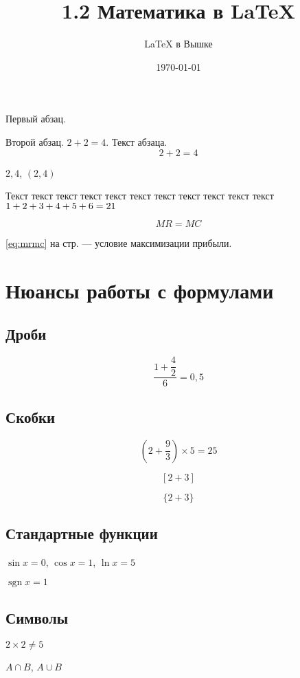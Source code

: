 \documentclass[a4paper,12pt]{article} %
\author{\LaTeX{} в Вышке}
\title{1.2 Математика в \LaTeX}
\date{\today}
\DeclareMathOperator{\sgn}{\mathop{sgn}}
\newcommand*{\hm}[1]{#1\nobreak\discretionary{}
{\hbox{$\mathsurround=0pt #1$}}{}}
\begin{document}

\maketitle

Первый         абзац.

Второй абзац.
$2 +    2 =   4   $. Текст абзаца.
\[  2+2=4  \]

$2,4$, $(2, 4)$

Текст текст текст текст текст текст текст текст текст текст текст $1\hm{+}2+3+4+5+6=21$

\begin{equation}\label{eq:mrmc}
MR=MC
\end{equation}


\eqref{eq:mrmc}  на стр. \pageref{eq:mrmc} --- условие максимизации прибыли.


\section{Нюансы работы с формулами}

\subsection{Дроби}

\[\frac{1+\dfrac{4}{2}}{6} = 0,5\]

\subsection{Скобки}

\[ \left(2+\frac{9}{3}\right) \times 5 = 25 \]

\[  [2+3]  \]

\[ \{2+3\}  \]

\subsection{Стандартные функции}

$\sin x = 0$, $\cos x = 1$, $\ln x = 5$

$\sgn  x = 1$

\subsection{Символы}

$2\times 2 \ne 5$

$A \cap B$, $A \cup B$
\end{document}
